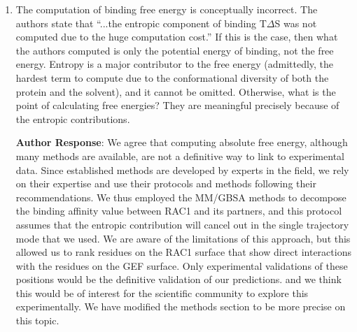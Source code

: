 \documentclass[11pt, a4paper]{article}
\begin{document}
\begin{enumerate}
\textbf{Author Response}: The exact definition of cryptic pocket can be debatable since by definition these pockets are transient, and even if our simulation time is long enough for results presented, it is important to be cautious about their existence. We considered that a pocket could be defined as crytpic, not only if its volume was about the threshold as described above, but also if the pockets was detectable for more few ns. We also took into account the presence of the pockets during simulation replicates, and show the split values in Supplementary Material \textcolor{red}{S9-S12}. To moderate this analysis, We have rephrased the discussion on this part to also indicate to the readers that the microsecond time scale could be a limitation since no spontaneous pocket openings were sampled in some systems without cosolvent probes.


    \item The computation of binding free energy is conceptually incorrect. The authors state that “...the entropic component of binding T$\Delta$S was not computed due to the huge computation cost.” If this is the case, then what the authors computed is only the potential energy of binding, not the free energy. Entropy is a major contributor to the free energy (admittedly, the hardest term to compute due to the conformational diversity of both the protein and the solvent), and it cannot be omitted. Otherwise, what is the point of calculating free energies? They are meaningful precisely because of the entropic contributions.
    
\textbf{Author Response}: We agree that computing absolute free energy, although many methods are available, are not a definitive way to link to experimental data. Since established methods are developed by experts in the field, we rely on their expertise and use their protocols and methods following their recommendations. We thus  employed the MM/GBSA methods to decompose the binding affinity value between RAC1 and its partners, and this protocol assumes that the entropic contribution will cancel out in the single trajectory mode that we used. We are aware of the limitations of this approach, but this allowed us to rank residues on the RAC1 surface that show direct interactions with the residues on the GEF surface. Only experimental validations of these positions would be the definitive validation of our predictions. and we think this would be of interest for the scientific community to explore this experimentally. We have modified the methods section to be more precise on this topic. 


\end{enumerate}
\end{document}
